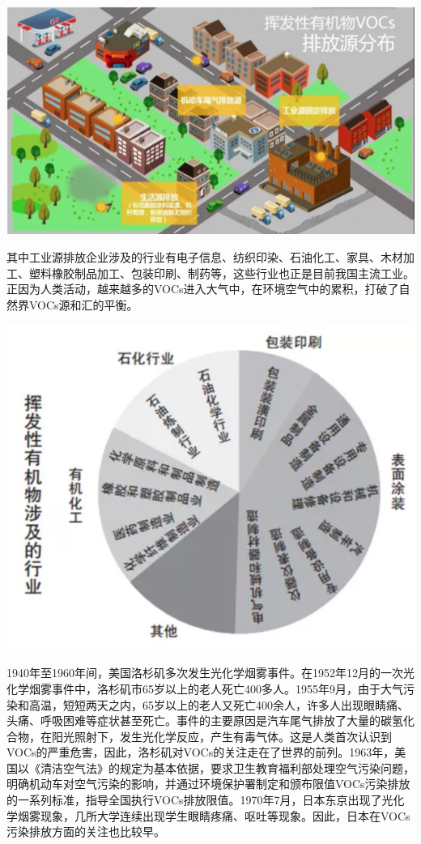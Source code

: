 \documentclass[
]{book}
\begin{document}
\includegraphics[width=8.33in]{images/voc4}

其中工业源排放企业涉及的行业有电子信息、纺织印染、石油化工、家具、木材加工、塑料橡胶制品加工、包装印刷、制药等，这些行业也正是目前我国主流工业。正因为人类活动，越来越多的VOCs进入大气中，在环境空气中的累积，打破了自然界VOCs源和汇的平衡。

\includegraphics[width=8.33in]{images/voc5}

1940年至1960年间，美国洛杉矶多次发生光化学烟雾事件。在1952年12月的一次光化学烟雾事件中，洛杉矶市65岁以上的老人死亡400多人。1955年9月，由于大气污染和高温，短短两天之内，65岁以上的老人又死亡400余人，许多人出现眼睛痛、头痛、呼吸困难等症状甚至死亡。事件的主要原因是汽车尾气排放了大量的碳氢化合物，在阳光照射下，发生光化学反应，产生有毒气体。这是人类首次认识到VOCs的严重危害，因此，洛杉矶对VOCs的关注走在了世界的前列。1963年，美国以《清洁空气法》的规定为基本依据，要求卫生教育福利部处理空气污染问题，明确机动车对空气污染的影响，并通过环境保护署制定和颁布限值VOCs污染排放的一系列标准，指导全国执行VOCs排放限值。1970年7月，日本东京出现了光化学烟雾现象，几所大学连续出现学生眼睛疼痛、呕吐等现象。因此，日本在VOCs污染排放方面的关注也比较早。
\end{document}

